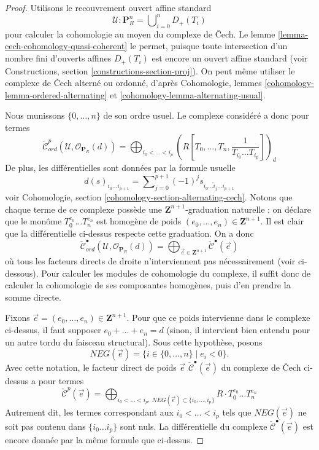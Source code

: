 \begin{proof}
Utilisons le recouvrement ouvert affine standard
$$
\mathcal{U} : \mathbf{P}^n_R = \bigcup\nolimits_{i = 0}^n D_{+}(T_i)
$$
pour calculer la cohomologie au moyen du complexe de {\v C}ech.
Le lemme \ref{lemma-cech-cohomology-quasi-coherent}
le permet, puisque toute intersection d'un nombre fini d'ouverts affines $D_{+}(T_i)$ est encore un
ouvert affine standard (voir
Constructions, section \ref{constructions-section-proj}).
On peut même utiliser le complexe de {\v C}ech alterné ou ordonné, d'après
Cohomologie, lemmes \ref{cohomology-lemma-ordered-alternating} et
\ref{cohomology-lemma-alternating-usual}.

\medskip\noindent
Nous munissons $\{0, \ldots, n\}$ de son ordre
usuel. Le complexe considéré a donc pour termes
$$
\check{\mathcal{C}}_{ord}^p(\mathcal{U}, \mathcal{O}_{\mathbf{P}_R}(d))
=
\bigoplus\nolimits_{i_0 < \ldots < i_p}
(R[T_0, \ldots, T_n, \frac{1}{T_{i_0} \ldots T_{i_p}}])_d
$$
De plus, les différentielles sont données par la formule usuelle
$$
d(s)_{i_0 \ldots i_{p + 1}} =
\sum\nolimits_{j = 0}^{p + 1} (-1)^j s_{i_0 \ldots \hat i_j \ldots i_{p + 1}}
$$
voir Cohomologie, section \ref{cohomology-section-alternating-cech}.
Notons que chaque terme de ce complexe possède une
$\mathbf{Z}^{n + 1}$-graduation naturelle : on déclare que le monôme
$T_0^{e_0} \ldots T_n^{e_n}$ est homogène de poids
$(e_0, \ldots, e_n) \in \mathbf{Z}^{n + 1}$. Il est clair que la
différentielle ci-dessus respecte cette graduation. On a donc
$$
\check{\mathcal{C}}_{ord}^\bullet(\mathcal{U}, \mathcal{O}_{\mathbf{P}_R}(d))
=
\bigoplus\nolimits_{\vec{e} \in \mathbf{Z}^{n + 1}}
\check{\mathcal{C}}^\bullet(\vec{e})
$$
où tous les facteurs directs de droite n'interviennent pas nécessairement (voir
ci-dessous). Pour calculer les modules de
cohomologie du complexe, il suffit donc de calculer la cohomologie de ses
composantes homogènes, puis d'en prendre la somme directe.

\medskip\noindent
Fixons $\vec{e} = (e_0, \ldots, e_n) \in \mathbf{Z}^{n + 1}$. Pour que ce
poids intervienne dans le complexe ci-dessus, il faut supposer
$e_0 + \ldots + e_n = d$ (sinon, il intervient bien entendu pour un autre tordu
du faisceau structural). Sous cette hypothèse, posons
$$
NEG(\vec{e}) = \{i \in \{0, \ldots, n\} \mid e_i < 0\}.
$$
Avec cette notation, le facteur direct de poids $\vec{e}$
$\check{\mathcal{C}}^\bullet(\vec{e})$ du complexe de {\v C}ech ci-dessus a
pour termes
$$
\check{\mathcal{C}}^p(\vec{e})
=
\bigoplus\nolimits_{i_0 < \ldots < i_p,
\ NEG(\vec{e}) \subset \{i_0, \ldots, i_p\}}
R \cdot T_0^{e_0} \ldots T_n^{e_n}
$$
Autrement dit, les termes correspondant aux $i_0 < \ldots < i_p$ tels
que $NEG(\vec{e})$ ne soit pas contenu dans $\{i_0 \ldots i_p\}$ sont nuls.
La différentielle du complexe $\check{\mathcal{C}}^\bullet(\vec{e})$
est encore donnée par la même formule que ci-dessus.


\end{proof}
